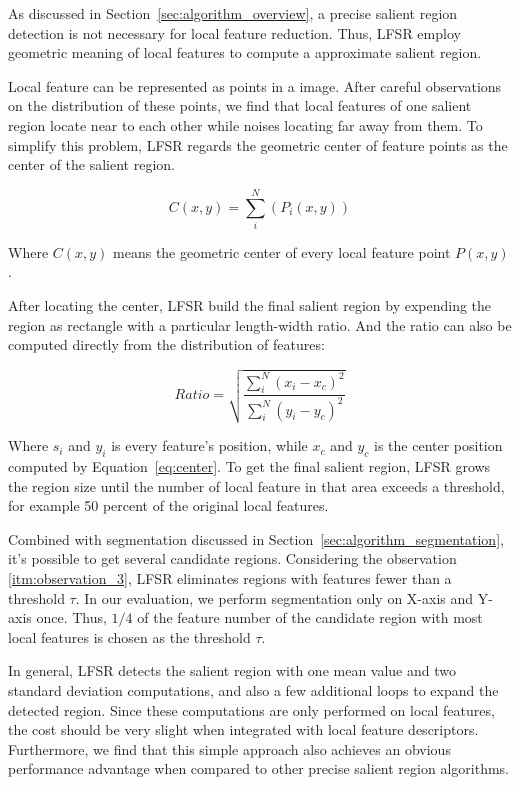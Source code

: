 As discussed in Section~\ref{sec:algorithm_overview}, a precise salient region detection is not necessary for local feature reduction. Thus, LFSR employ geometric meaning of local features to compute a approximate salient region.

Local feature can be represented as points in a image. After careful observations on the distribution of these points, we find that local features of one salient region locate near to each other while noises locating far away from them. To simplify this problem, LFSR regards the geometric center of feature points as the center of the salient region.

{\begin{equation} \label{eq:center}
C(x, y) = \sum_{i}^{N}\left({P}_{i}(x, y) \right)
\end{equation}}

Where $C(x, y)$ means the geometric center of every local feature point $P(x, y)$.

After locating the center, LFSR build the final salient region by expending the region as rectangle with a particular length-width ratio. And the ratio can also be computed directly from the distribution of features:

{\begin{equation} \label{eq:ratio}
Ratio = \sqrt{\frac{\sum_{i}^{N}\left ( x_{i}-x_{c} \right )^{2}}{\sum_{i}^{N}\left ( y_{i}-y_{c} \right )^{2}}}
\end{equation}}

Where $s_{i}$ and $y_{i}$ is every feature's position, while $x_{c}$ and $y_{c}$ is the center position computed by Equation~\ref{eq:center}. To get the final salient region, LFSR grows the region size until the number of local feature in that area exceeds a threshold, for example 50 percent of the original local features.

Combined with segmentation discussed in Section~\ref{sec:algorithm_segmentation}, it's possible to get several candidate regions. Considering the observation \ref{itm:observation_3}, LFSR eliminates regions with features fewer than a threshold $\tau$. In our evaluation, we perform segmentation only on X-axis and Y-axis once. Thus, $1/4$ of the feature number of the candidate region with most local features is chosen as the threshold $\tau$.

In general, LFSR detects the salient region with one mean value and two standard deviation computations, and also a few additional loops to expand the detected region. Since these computations are only performed on local features, the cost should be very slight when integrated with local feature descriptors. Furthermore, we find that this simple approach also achieves an obvious performance advantage when compared to other precise salient region algorithms.